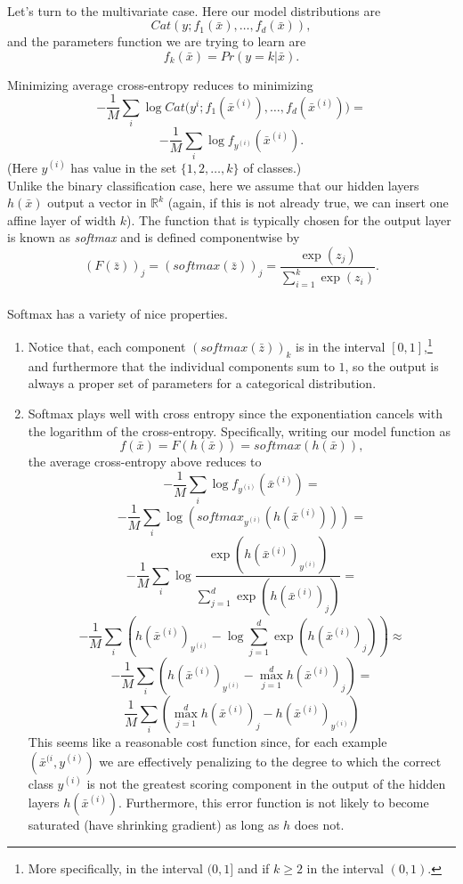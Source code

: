 \documentclass{article}
\begin{document}
\begin{itemize}
\paragraph{} Let's turn to the multivariate case.  Here our model distributions are $$Cat(y; f_{1}(\bar{x}), \ldots, f_{d}(\bar{x})),$$ and the parameters function we are trying to learn are 
$$f_{k}(\bar{x}) = Pr(y = k \vert \bar{x}).$$

Minimizing average cross-entropy reduces to minimizing 
$$-\frac{1}{M}\sum_{i} \log{Cat(y^{i} ; f_{1}(\bar{x}^{(i)}), \ldots, f_{d}(\bar{x}^{(i)})}) = $$
$$-\frac{1}{M}\sum_{i} \log{f_{y^{(i)}}(\bar{x}^{(i)})} .$$
(Here $y^{(i)}$ has value in the set $\{1, 2, \dots, k\}$ of classes.)\\
Unlike the binary classification case, here we assume that our hidden layers $h(\bar{x})$ output a vector in $\mathbb{R}^{k}$ (again, if this is not already true, we can insert one affine layer of width $k$).
The function that is typically chosen for the output layer is known as \emph{softmax} and is defined componentwise by 
$$(F(\bar{z}))_{j} = (softmax(\bar{z}))_{j} = \frac{\exp{(z_{j})}}{\sum_{i= 1}^{k} \exp{(z_{i})}}.$$
\\
Softmax has a variety of nice properties.  
\begin{enumerate}
\item Notice that, each component $(softmax(\bar{z}))_{k}$ is in the interval $[0, 1]$,\footnote{More specifically, in the interval $(0, 1]$ and if $k \geq 2$ in the interval $(0, 1)$.} and furthermore that the individual components sum to $1$, so the output is always a proper set of parameters for a categorical distribution. 
\item Softmax plays well with cross entropy since the exponentiation cancels with the logarithm of the cross-entropy.   Specifically, writing our model function as
$$f(\bar{x}) = F(h(\bar{x})) = softmax(h(\bar{x})),$$ 
the average cross-entropy above reduces to 
$$-\frac{1}{M}\sum_{i} \log{f_{y^{(i)}}(\bar{x}^{(i)})} = $$
$$-\frac{1}{M}\sum_{i} \log{(softmax_{y^{(i)}}(h(\bar{x}^{(i)})))} = $$
$$-\frac{1}{M}\sum_{i} \log{\frac{\exp{(h(\bar{x}^{(i)})_{y^{(i)}})}}{\sum_{j = 1}^{d} \exp{(h(\bar{x}^{(i)})_{j})}}}= $$
$$-\frac{1}{M}\sum_{i} \left( h(\bar{x}^{(i)})_{y^{(i)}} - \log{\sum_{j = 1}^{d} \exp{(h(\bar{x}^{(i)})_{j})}}\right) \approx$$
$$-\frac{1}{M}\sum_{i} \left( h(\bar{x}^{(i)})_{y^{(i)}} - \max_{j = 1}^{d} {h(\bar{x}^{(i)})_{j}}\right) = $$
$$\frac{1}{M}\sum_{i} \left( \max_{j = 1}^{d} {h(\bar{x}^{(i)})_{j}} -  h(\bar{x}^{(i)})_{y^{(i)}}\right) $$
This seems like a reasonable cost function since, for each example $(\bar{x}^{(i}, y^{(i)})$ we are effectively penalizing to the degree to which the correct class $y^{(i)}$ is not the greatest scoring component in the output of the hidden layers $h(\bar{x}^{(i)})$.  Furthermore, this error function is not likely to become saturated (have shrinking gradient) as long as $h$ does not.
\end{enumerate}
\end{itemize}
\end{document}

